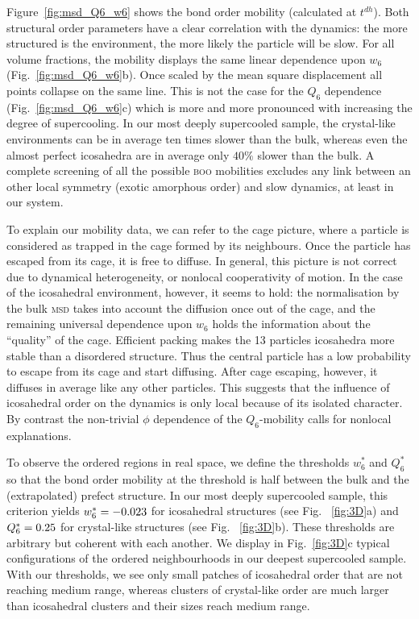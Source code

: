 Figure~\ref{fig:msd_Q6_w6} shows the bond order mobility (calculated at $t^{dh}$). Both structural order parameters have a clear correlation with the dynamics: the more structured is the environment, the more likely the particle will be slow. For all volume fractions, the mobility displays the same linear dependence upon $w_6$ (Fig.~\ref{fig:msd_Q6_w6}b). Once scaled by the mean square displacement all points collapse on the same line. This is not the case for the $Q_6$ dependence (Fig.~\ref{fig:msd_Q6_w6}c) which is more and more pronounced with increasing the degree of supercooling. In our most deeply supercooled sample, the crystal-like environments can be in average ten times slower than the bulk, whereas even the almost perfect icosahedra are in average only $40\%$ slower than the bulk. A complete screening of all the possible \textsc{boo} mobilities excludes any link between an other local symmetry (exotic amorphous order) and slow dynamics, at least in our system.

To explain our mobility data, we can refer to the cage picture, where a particle is considered as trapped in the cage formed by its neighbours. Once the particle has escaped from its cage, it is free to diffuse. In general, this picture is not correct due to dynamical heterogeneity, or nonlocal cooperativity of motion. In the case of the icosahedral environment, however, it seems to hold: the normalisation by the bulk \textsc{msd} takes into account the diffusion once out of the cage, and the remaining universal dependence upon $w_6$ holds the information about the ``quality'' of the cage. Efficient packing makes the 13 particles icosahedra more stable than a disordered structure. Thus the central particle has a low probability to escape from its cage and start diffusing. After cage escaping, however, it diffuses in average like any other particles. This suggests that the influence of icosahedral order on the dynamics is only local because of its isolated character. By contrast the non-trivial $\phi$ dependence of the $Q_6$-mobility calls for nonlocal explanations.

To observe the ordered regions in real space, we define the thresholds $w_6^*$ and $Q_6^*$ so that the bond order mobility at the threshold is half between the bulk and the (extrapolated) prefect structure. In our most deeply supercooled sample, this criterion yields $w_6^* = -0.023$ for icosahedral structures (see Fig. ~\ref{fig:3D}a) and $Q_6^* = 0.25$ for crystal-like structures (see Fig. ~\ref{fig:3D}b). These thresholds are arbitrary but coherent with each another. We display in Fig.~\ref{fig:3D}c typical configurations of the ordered neighbourhoods in our deepest supercooled sample. With our thresholds, we see only small patches of icosahedral order that are not reaching medium range, whereas clusters of crystal-like order are much larger than icosahedral clusters and their sizes reach medium range. 



